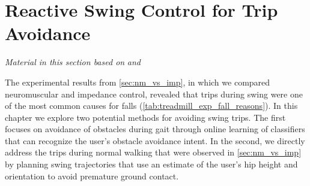 \chapter{Reactive Swing Control for Trip Avoidance}\label{sec:trip_avoidance}
\graphicspath{{chapters/trip_avoidance/figures/}}

\emph{Material in this section based on}
\citet{gordon2019online}\cite{gordon2019online} \emph{and}
\citet{thatte2019realtime}\cite{thatte2019realtime} \linebreak

The experimental results from \cref{sec:nm_vs_imp}, in which we compared
neuromuscular and impedance control, revealed that trips during swing were one
of the most common causes for falls (\cref{tab:treadmill_exp_fall_reasons}). In
this chapter we explore two potential methods for avoiding swing trips. The
first focuses on avoidance of obstacles during gait through online learning of
classifiers that can recognize the user's obstacle avoidance intent. In the
second, we directly address the trips during normal walking that were observed
in \cref{sec:nm_vs_imp} by planning swing trajectories that use an estimate of
the user's hip height and orientation to avoid premature ground contact.









